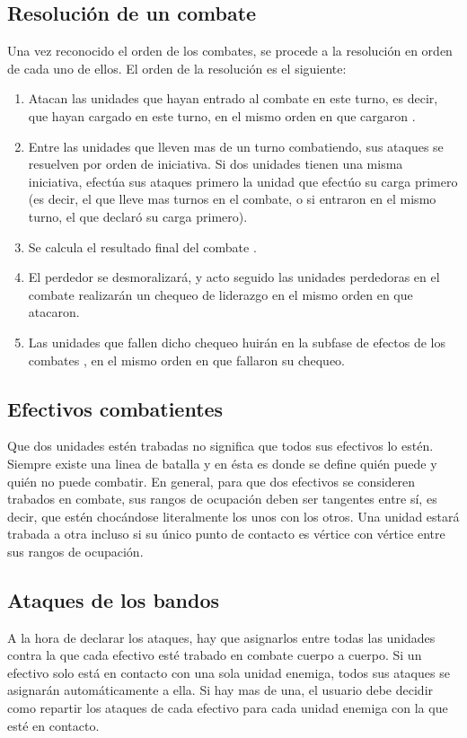 \subsection*{Resolución de un combate}
\label{resolucion}
Una vez reconocido el orden de los combates, se procede a la
resolución en orden de cada uno de ellos. El orden de la resolución es
el siguiente:
\begin{enumerate}
\item Atacan las unidades que hayan entrado al combate en este turno,
  es decir, que hayan cargado en este turno, en el mismo orden en que
  cargaron .
\item Entre las unidades que lleven mas de un turno combatiendo, sus
  ataques se resuelven por orden de iniciativa. Si dos unidades tienen
  una misma iniciativa, efectúa sus ataques primero la unidad que
  efectúo su carga primero (es decir, el que lleve mas turnos en el
  combate, o si entraron en el mismo turno, el que declaró su carga primero).
\item Se calcula el resultado final del combate .
\item El perdedor se desmoralizará, y acto seguido las unidades
  perdedoras en el combate realizarán un chequeo de liderazgo en el
  mismo orden en que atacaron.
\item Las unidades que fallen dicho chequeo huirán en la subfase de
  efectos de los combates , en el mismo orden en que fallaron su
  chequeo.
\end{enumerate}

\subsection*{Efectivos combatientes}
\label{efectivoscombatientes}
Que dos unidades estén trabadas no significa que todos sus efectivos
lo estén. Siempre existe una linea de batalla y en ésta es donde se
define quién puede y quién no puede combatir. En general, para que dos
efectivos se consideren trabados en combate, sus rangos de ocupación
deben ser tangentes entre sí, es decir, que estén chocándose
literalmente los unos con los otros. Una unidad estará trabada a otra
incluso si su único punto de contacto es vértice con vértice entre sus
rangos de ocupación.

\subsection*{Ataques de los bandos}
\label{ataques}
A la hora de declarar los ataques, hay que asignarlos entre todas las
unidades contra la que cada efectivo esté trabado en combate cuerpo a
cuerpo. Si un efectivo solo está en contacto con una sola unidad
enemiga, todos sus ataques se asignarán automáticamente a ella. Si hay
mas de una, el usuario debe decidir como repartir los ataques de cada
efectivo para cada unidad enemiga con la que esté en contacto.

